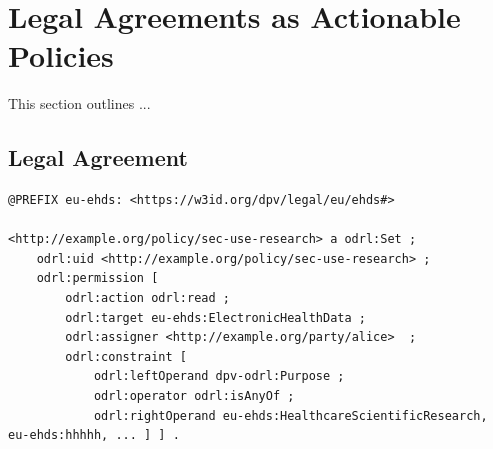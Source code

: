 \section{Legal Agreements as Actionable Policies}
\label{sec:policies}

This section outlines ...

\subsection{Legal Agreement}
\label{sec:catalog}

\begin{scriptsize}
\begin{lstlisting}[language=turtle, caption=Secondary use policy for purposes associated with healthcare scientific research.,  label=lst:HealthcareScientificResearch]
@PREFIX eu-ehds: <https://w3id.org/dpv/legal/eu/ehds#>

<http://example.org/policy/sec-use-research> a odrl:Set ;
    odrl:uid <http://example.org/policy/sec-use-research> ;
    odrl:permission [
        odrl:action odrl:read ;
        odrl:target eu-ehds:ElectronicHealthData ;
        odrl:assigner <http://example.org/party/alice>  ;
        odrl:constraint [
            odrl:leftOperand dpv-odrl:Purpose ;
            odrl:operator odrl:isAnyOf ;
            odrl:rightOperand eu-ehds:HealthcareScientificResearch, eu-ehds:hhhhh, ... ] ] .
\end{lstlisting}
\end{scriptsize}
